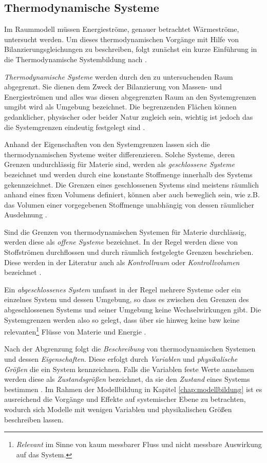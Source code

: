 \subsection{Thermodynamische Systeme}
Im Raummodell müssen Energieströme, genauer betrachtet Wärmeströme, untersucht werden. Um dieses thermodynamischen Vorgänge mit Hilfe von Bilanzierungsgleichungen zu beschreiben, folgt zunächst ein kurze Einführung in die Thermodynamische Systembildung nach \cite[S.~11ff.]{ba12}.

\textit{Thermodynamische Systeme} werden durch den zu untersuchenden Raum abgegrenzt. Sie dienen dem Zweck der Bilanzierung von Massen- und Energieströmen und alles was diesen abgegrenzten Raum an den Systemgrenzen umgibt wird als Umgebung bezeichnet. Die begrenzenden Flächen können gedanklicher, physischer oder beider Natur zugleich sein, wichtig ist jedoch das die Systemgrenzen eindeutig festgelegt sind \cite[S.~11]{ba12}.

Anhand der Eigenschaften von den Systemgrenzen lassen sich die thermodynamischen Systeme weiter differenzieren.
Solche Systeme, deren Grenzen undurchlässig für Materie sind, werden als \textit{geschlossene Systeme} bezeichnet und werden durch eine konstante Stoffmenge innerhalb des Systems gekennzeichnet. Die Grenzen eines geschlossenen Systems sind meistens räumlich anhand eines fixen Volumens definiert, können aber auch beweglich sein, wie z.B. das Volumen einer vorgegebenen Stoffmenge unabhängig von dessen räumlicher Ausdehnung \cite[S.~12]{ba12}.

Sind die Grenzen von thermodynamischen Systemen für Materie durchlässig, werden diese als \textit{offene Systeme} bezeichnet. In der Regel werden diese von Stoffströmen durchflossen und durch räumlich festgelegte Grenzen beschrieben. Diese werden in der Literatur auch als \textit{Kontrollraum} oder \textit{Kontrollvolumen} bezeichnet \cite[S.~12]{ba12}.

Ein \textit{abgeschlossenes System} umfasst in der Regel mehrere Systeme oder ein einzelnes System und dessen Umgebung, so dass es zwischen den Grenzen des abgeschlossenen Systems und seiner Umgebung keine Wechselwirkungen gibt. Die Systemgrenzen werden also so gelegt, dass über sie hinweg keine \acrlong{bzw} keine relevanten\footnote{\textit{Relevant} im Sinne von kaum messbarer Fluss und nicht messbare Auswirkung auf das System.} Flüsse von Materie und Energie \cite[S.~13]{ba12}.

Nach der Abgrenzung folgt die \textit{Beschreibung} von thermodynamischen Systemen und dessen \textit{Eigenschaften}. Diese erfolgt durch \textit{Variablen} und \textit{physikalische Größen} die ein System kennzeichnen. Falls die Variablen feste Werte annehmen werden diese als \textit{Zustandsgrößen} bezeichnet, da sie den \textit{Zustand} eines Systems bestimmen \cite[S.~13]{ba12}. Im Rahmen der Modellbildung in Kapitel \ref{chap:modellbildung} ist es ausreichend die Vorgänge und Effekte auf systemischer Ebene zu betrachten, wodurch sich Modelle mit wenigen Variablen und physikalischen Größen beschreiben lassen.

